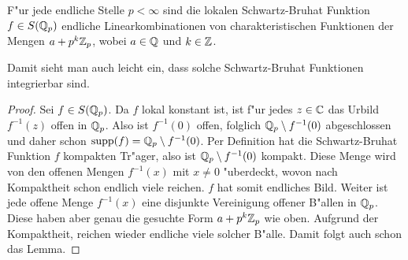 		\begin{lemma}\label{lemma:padischSBF}
			F"ur jede endliche Stelle $p<\infty$ sind die lokalen Schwartz-Bruhat Funktion $f\in S({\mathbb{Q}_p})$ endliche Linearkombinationen von charakteristischen Funktionen der Mengen ${a+p^k{\mathbb{Z}_p}}$, wobei $a\in \mathbb{Q}$ und $k\in \mathbb{Z}$.
		\end{lemma}
		Damit sieht man auch leicht ein, dass solche Schwartz-Bruhat Funktionen integrierbar sind.
		\begin{proof}
			Sei $f \in S({\mathbb{Q}_p})$. 
			Da $f$ lokal konstant ist, ist f"ur jedes $z\in\mathbb{C}$ das Urbild $f^{-1}(z)$ offen in ${\mathbb{Q}_p}$. 
			Also ist $f^{-1}(0)$ offen, folglich ${\mathbb{Q}_p} \setminus f^{-1}(0)$ abgeschlossen und daher schon $\text{supp}(f) = {\mathbb{Q}_p} \setminus f^{-1}(0)$. 
			Per Definition hat die Schwartz-Bruhat Funktion $f$ kompakten Tr"ager, also ist ${\mathbb{Q}_p} \setminus f^{-1}(0)$ kompakt. 
			Diese Menge wird von den offenen Mengen $f^{-1} (x)$ mit $x\not= 0$ "uberdeckt, wovon nach Kompaktheit schon endlich viele reichen.
			$f$ hat somit endliches Bild. Weiter ist jede offene Menge $f^{-1} (x)$ eine disjunkte Vereinigung offener B"allen in ${\mathbb{Q}_p}$. 
			Diese haben aber genau die gesuchte Form $a+p^k{\mathbb{Z}_p}$ wie oben. 
			Aufgrund der Kompaktheit, reichen wieder endliche viele solcher B"alle. Damit folgt auch schon das Lemma.
		\end{proof}
		
